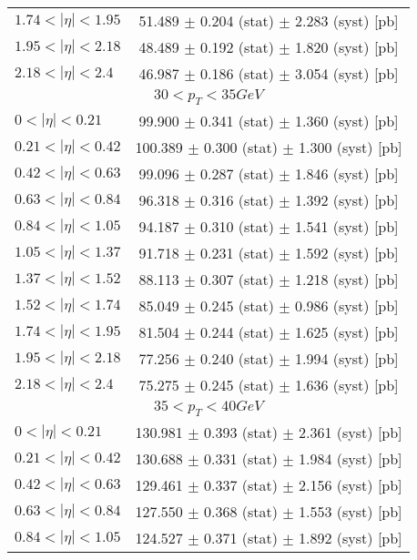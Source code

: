 \begin{tabular}{lc}
$1.74 < |\eta| <1.95$          & 51.489 $\pm$ 0.204 (stat) $\pm$ 2.283 (syst) [pb]  \\
$1.95 < |\eta| <2.18$          & 48.489 $\pm$ 0.192 (stat) $\pm$ 1.820 (syst) [pb]  \\
$2.18 < |\eta| <2.4$           & 46.987 $\pm$ 0.186 (stat) $\pm$ 3.054 (syst) [pb]  \\
\hline
\multicolumn{2}{c}{$30 < p_{T} < 35 GeV$} \\
\hline
$0 < |\eta| <0.21$             & 99.900 $\pm$ 0.341 (stat) $\pm$ 1.360 (syst) [pb]  \\
$0.21 < |\eta| <0.42$          & 100.389 $\pm$ 0.300 (stat) $\pm$ 1.300 (syst) [pb]  \\
$0.42 < |\eta| <0.63$          & 99.096 $\pm$ 0.287 (stat) $\pm$ 1.846 (syst) [pb]  \\
$0.63 < |\eta| <0.84$          & 96.318 $\pm$ 0.316 (stat) $\pm$ 1.392 (syst) [pb]  \\
$0.84 < |\eta| <1.05$          & 94.187 $\pm$ 0.310 (stat) $\pm$ 1.541 (syst) [pb]  \\
$1.05 < |\eta| <1.37$          & 91.718 $\pm$ 0.231 (stat) $\pm$ 1.592 (syst) [pb]  \\
$1.37 < |\eta| <1.52$          & 88.113 $\pm$ 0.307 (stat) $\pm$ 1.218 (syst) [pb]  \\
$1.52 < |\eta| <1.74$          & 85.049 $\pm$ 0.245 (stat) $\pm$ 0.986 (syst) [pb]  \\
$1.74 < |\eta| <1.95$          & 81.504 $\pm$ 0.244 (stat) $\pm$ 1.625 (syst) [pb]  \\
$1.95 < |\eta| <2.18$          & 77.256 $\pm$ 0.240 (stat) $\pm$ 1.994 (syst) [pb]  \\
$2.18 < |\eta| <2.4$           & 75.275 $\pm$ 0.245 (stat) $\pm$ 1.636 (syst) [pb]  \\
\hline
\multicolumn{2}{c}{$35 < p_{T} < 40 GeV$} \\
\hline
$0 < |\eta| <0.21$             & 130.981 $\pm$ 0.393 (stat) $\pm$ 2.361 (syst) [pb]  \\
$0.21 < |\eta| <0.42$          & 130.688 $\pm$ 0.331 (stat) $\pm$ 1.984 (syst) [pb]  \\
$0.42 < |\eta| <0.63$          & 129.461 $\pm$ 0.337 (stat) $\pm$ 2.156 (syst) [pb]  \\
$0.63 < |\eta| <0.84$          & 127.550 $\pm$ 0.368 (stat) $\pm$ 1.553 (syst) [pb]  \\
$0.84 < |\eta| <1.05$          & 124.527 $\pm$ 0.371 (stat) $\pm$ 1.892 (syst) [pb]  \\

\end{tabular}
